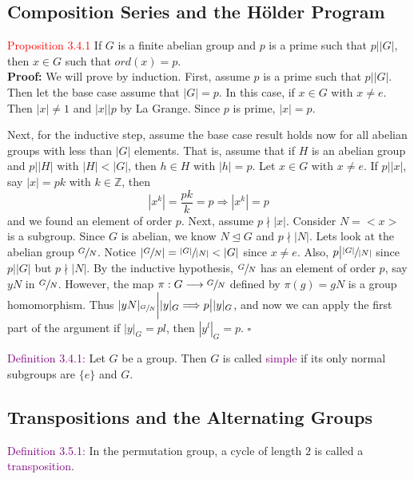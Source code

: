 \documentclass{article}
\begin{document}
\setcounter{subsection}{3}
\subsection{Composition Series and the H\"{o}lder Program}

\textcolor{red}{Proposition 3.4.1} If $G$ is a finite abelian group and $p$ is a prime such that $p \big| |G|$, then $x \in G$ such that 
$ord(x) = p$.\\
\textbf{Proof:} We will prove by induction. First, assume $p$ is a prime such that $p \big| |G|$. Then let the base case assume that 
$|G| = p$. In this case, if $x \in G$ with $x \neq e$. Then $|x| \neq 1$ and $|x| \big| p$ by La Grange. Since $p$ is prime, $|x|=p$.

Next, for the inductive step, assume the base case result holds now for all abelian groups with less than $|G|$ elements. That is, assume 
that if $H$ is an abelian group and $p \big| |H|$ with $|H| < |G|$, then $h \in H$ with $|h| = p$. Let $x \in G$ with $x \neq e$. If $p \big| |x|$, say $|x| = pk$ with $k \in \mathbb{Z}$, then
\[
    |x^k| = \dfrac{pk}{k} = p \Longrightarrow |x^k| = p
\]
and we found an element of order $p$. Next, assume $p \nmid |x|$. Consider $N = <x>$ is a subgroup. Since $G$ is abelian, we know 
$N \trianglelefteq G$ and $p \nmid |N|$. Lets look at the abelian group $\sfrac{G}{N}$. Notice $|\sfrac{G}{N}| = \sfrac{|G|}{|N|} < |G|$ since $x \neq e$. Also, $p \big| \sfrac{|G|}{|N|}$ since $p | |G|$ but $p \nmid |N|$. By the inductive hypothesis, $\sfrac{G}{N}$ has an element of order $p$, say $yN$ in $\sfrac{G}{N}$. However, the map $\pi : G \longrightarrow \sfrac{G}{N}$ defined by $\pi(g) = gN$ is a group homomorphism. Thus $|yN|_{\sfrac{G}{N}} \bigg| |y|_G \Longrightarrow p \big| |y|_G$, and now we can apply the first part of the argument if $|y|_G = pl$, then $|y^l|_G = p$. $\square$

\textcolor{purple}{Definition 3.4.1:} Let $G$ be a group. Then $G$ is called \textcolor{purple}{simple} if its only normal subgroups are 
$\{e\}$ and $G$.


\subsection{Transpositions and the Alternating Groups}

\textcolor{purple}{Definition 3.5.1:} In the permutation group, a cycle of length $2$ is called a \textcolor{purple}{transposition}.
\end{document}
